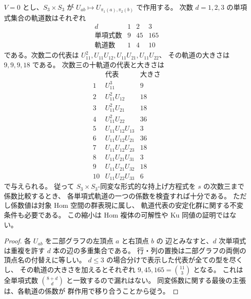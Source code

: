 


\begin{lemma}[一方向九係数の三次までの有限群軌道数]
\label{ifj:lem:mixed-koszul-parameter-orbits}
$V=0$ とし、$S_3\times S_3$ が
$U_{ab}\mapsto U_{\pi_1(a),\pi_2(b)}$ で作用する。
次数 $d=1,2,3$ の単項式集合の軌道数はそれぞれ
\begin{equation}\label{ifj:eq:mixed-koszul-orbit-counts}
  \begin{array}{c|ccc}
   d&1&2&3\\\hline
   \text{単項式数}&9&45&165\\
   \text{軌道数}&1&4&10
  \end{array}
\end{equation}
である。次数二の代表は
$U_{11}^2,U_{11}U_{12},U_{11}U_{21},U_{11}U_{22}$、
その軌道の大きさは $9,9,9,18$ である。
次数三の十軌道の代表と大きさは
\[
 \begin{array}{c|l|r}
  &\text{代表}&\text{大きさ}\\\hline
 1&U_{11}^3&9\\
 2&U_{11}^2U_{12}&18\\
 3&U_{11}^2U_{21}&18\\
 4&U_{11}^2U_{22}&36\\
 5&U_{11}U_{12}U_{13}&3\\
 6&U_{11}U_{12}U_{21}&36\\
 7&U_{11}U_{12}U_{23}&18\\
 8&U_{11}U_{21}U_{31}&3\\
 9&U_{11}U_{21}U_{32}&18\\
 10&U_{11}U_{22}U_{33}&6
 \end{array}
\]
で与えられる。
従って $S_3\times S_3$-同変な形式的な持上げ方程式を
$s$ の次数三まで係数比較するとき、
各単項式軌道の一つの係数を検査すれば十分である。
ただし係数値は対象 Hom 空間の群表現に属し、
軌道代表の安定化群に関する不変条件も必要である。
この縮小は Hom 複体の可解性や Ku 同値の証明ではない。
\end{lemma}

\begin{proof}
各 $U_{ab}$ を二部グラフの左頂点 $a$ と右頂点 $b$ の
辺とみなすと、$d$ 次単項式は重複を許す $d$ 本の辺の多重集合である。
行・列の置換は二部グラフの両側の頂点名の付替えに等しい。
$d\le3$ の場合分けで表示した代表が全ての型を尽くし、
その軌道の大きさを加えるとそれぞれ
$9,45,165=\binom{11}{3}$ となる。
これは全単項式数 $\binom{8+d}{d}$ と一致するので漏れはない。
同変係数に関する最後の主張は、各軌道の係数が
群作用で移り合うことから従う。
\end{proof}

